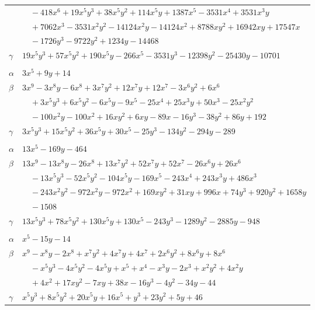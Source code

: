 \documentclass[11pt]{article}
\begin{document}
\begin{longtable}{@{}ll@{}}
 & $\quad -418x^{6}+19x^{5}y^{3}+38x^{5}y^{2}+114x^{5}y+1387x^{5}-3531x^{4}+3531x^{3}y$\\
 & $\quad +7062x^{3}-3531x^{2}y^{2}-14124x^{2}y-14124x^{2}+8788xy^{2}+16942xy+17547x$\\
 & $\quad -1726y^{3}-9722y^{2}+1234y-14468$\\
$\gamma$ & $19x^{5}y^{3}+57x^{5}y^{2}+190x^{5}y-266x^{5}-3531y^{3}-12398y^{2}-25430y-10701$\\
\addlinespace[3pt]
\multicolumn{2}{@{}l}{$\{i,j\}=\{13,31\}$, $k_{ij}=2^{4}\cdot 13$}\\
$\alpha$ & $3x^{5}+9y+14$\\
$\beta$ & $3x^{9}-3x^{8}y-6x^{8}+3x^{7}y^{2}+12x^{7}y+12x^{7}-3x^{6}y^{2}+6x^{6}$\\
 & $\quad +3x^{5}y^{3}+6x^{5}y^{2}-6x^{5}y-9x^{5}-25x^{4}+25x^{3}y+50x^{3}-25x^{2}y^{2}$\\
 & $\quad -100x^{2}y-100x^{2}+16xy^{2}+6xy-89x-16y^{3}-38y^{2}+86y+192$\\
$\gamma$ & $3x^{5}y^{3}+15x^{5}y^{2}+36x^{5}y+30x^{5}-25y^{3}-134y^{2}-294y-289$\\
\addlinespace[3pt]
\multicolumn{2}{@{}l}{$\{i,j\}=\{13,35\}$, $k_{ij}=2^{2}\cdot 5^{3}\cdot 7$}\\
$\alpha$ & $13x^{5}-169y-464$\\
$\beta$ & $13x^{9}-13x^{8}y-26x^{8}+13x^{7}y^{2}+52x^{7}y+52x^{7}-26x^{6}y+26x^{6}$\\
 & $\quad -13x^{5}y^{3}-52x^{5}y^{2}-104x^{5}y-169x^{5}-243x^{4}+243x^{3}y+486x^{3}$\\
 & $\quad -243x^{2}y^{2}-972x^{2}y-972x^{2}+169xy^{2}+31xy+996x+74y^{3}+920y^{2}+1658y$\\
 & $\quad -1508$\\
$\gamma$ & $13x^{5}y^{3}+78x^{5}y^{2}+130x^{5}y+130x^{5}-243y^{3}-1289y^{2}-2885y-948$\\
\addlinespace[3pt]
\multicolumn{2}{@{}l}{$\{i,j\}=\{13,39\}$, $k_{ij}=2^{3}\cdot 3\cdot 5$}\\
$\alpha$ & $x^{5}-15y-14$\\
$\beta$ & $x^{9}-x^{8}y-2x^{8}+x^{7}y^{2}+4x^{7}y+4x^{7}+2x^{6}y^{2}+8x^{6}y+8x^{6}$\\
 & $\quad -x^{5}y^{3}-4x^{5}y^{2}-4x^{5}y+x^{5}+x^{4}-x^{3}y-2x^{3}+x^{2}y^{2}+4x^{2}y$\\
 & $\quad +4x^{2}+17xy^{2}-7xy+38x-16y^{3}-4y^{2}-34y-44$\\
$\gamma$ & $x^{5}y^{3}+8x^{5}y^{2}+20x^{5}y+16x^{5}+y^{3}+23y^{2}+5y+46$\\

\end{longtable}
\end{document}
